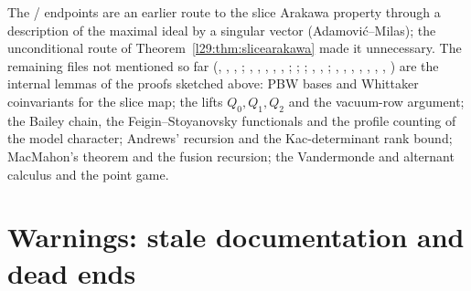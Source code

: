 The / endpoints are an earlier route to the slice
Arakawa property through a description of the maximal ideal by a singular vector (Adamovi\'c--Milas); the unconditional
route of Theorem~\ref{l29:thm:slicearakawa} made it unnecessary. The remaining files not mentioned so far
(, , , ;
, , , ,
, ; ; ;
, , ;
, , , ,
, , ,
) are the internal lemmas of the proofs sketched above: PBW bases and Whittaker
coinvariants for the slice map; the lifts $Q_0,Q_1,Q_2$ and the vacuum-row argument; the Bailey chain, the
Feigin--Stoyanovsky functionals and the profile counting of the model character; Andrews' recursion and the
Kac-determinant rank bound; MacMahon's theorem and the fusion recursion; the Vandermonde and alternant calculus and the
point game.

\section{Warnings: stale documentation and dead ends}\label{l29:sec:deadends}


